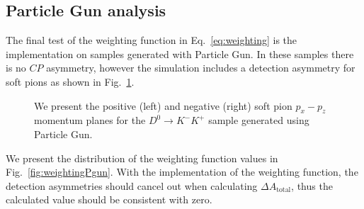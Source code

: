 \documentclass{article}
\begin{document}
        \subsection{Particle Gun analysis}
        The final test of the weighting function in Eq.~\ref{eq:weighting} is the implementation on samples generated with Particle Gun.
        In these samples there is no $CP$ asymmetry, however the simulation includes a detection asymmetry for soft pions as shown in Fig.~\ref{fig:detection_pgun}.
        \begin{figure}[h!]
                \centering
                \caption{We present the positive (left) and negative (right) soft pion $p_x - p_z$ momentum planes for the $D^0\to K^-K^+$ sample generated using Particle Gun.}
                \label{fig:detection_pgun}
        \end{figure}

        We present the distribution of the weighting function values in Fig.~\ref{fig:weightingPgun}.
        With the implementation of the weighting function, the detection asymmetries should cancel out when calculating $\Delta A_\text{total}$, thus the calculated value should be consistent with zero.
\end{document}
